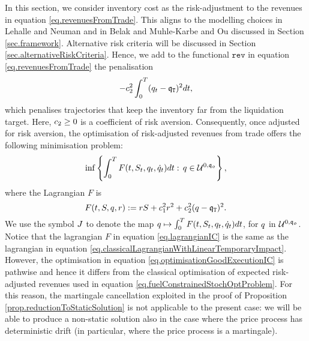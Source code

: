 \documentclass[10pt,a4paper]{article}
\begin{document}
In this section, we consider inventory cost as the risk-adjustment to the revenues in equation \eqref{eq.revenuesFromTrade}. This aligns to the modelling choices in Lehalle and Neuman \cite{LN19inc} and in Belak and Muhle-Karbe and Ou \cite{BMO18opt} discussed in Section \ref{sec.framework}. Alternative risk criteria will be discussed in Section \ref{sec.alternativeRiskCriteria}. Hence, we  add to the functional $\mathtt{rev}$ in equation \eqref{eq.revenuesFromTrade} the penalisation 
\begin{equation}\label{eq.classicalRiskAversion}
-c_{2}^{2} \int_{0}^{T} (q_t- \mathfrak{q}_{\mathtt{T} })^{2} dt,
\end{equation}
which penalises trajectories that keep the inventory far from the liquidation target. Here, $c_{2}\geq 0$ is a coefficient of risk aversion. Consequently, once adjusted for risk aversion, the optimisation of risk-adjusted revenues from trade  offers the following minimisation problem:
\begin{equation}\label{eq.optimisationGoodExecutionIC}
\inf \left\lbrace
\int_{0}^{T} F (t,S_t, q_t,\dot{q}_{t} )dt: \,  q \in \mathcal{U}^{0,\mathfrak{q_0}}
\right\rbrace,
\end{equation}
where the Lagrangian $F$ is 
\begin{equation}\label{eq.lagrangianIC}
F(t,S,q,r):= rS + c_{1}^{2} r^{2} +c_{2}^{2} (q-\mathfrak{q}_{\mathtt{T} })^{2}.
\end{equation}
We use the symbol $J$ to denote the map $q  \mapsto \int_{0}^{T} F (t,S_t, q_t,\dot{q}_{t} )dt$, for $q$ in $\mathcal{U}^{0,\mathfrak{q_0}}$. 
Notice that the lagrangian $F$ in equation \eqref{eq.lagrangianIC} is the same as the lagrangian in equation \eqref{eq.classicalLagrangianWithLinearTemporaryImpact}. However, the optimisation in equation \eqref{eq.optimisationGoodExecutionIC} is pathwise and hence it  differs from the classical optimisation of expected risk-adjusted revenues used in equation \eqref{eq.fuelConstrainedStochOptProblem}. For this reason, the martingale cancellation exploited in the proof of Proposition \ref{prop.reductionToStaticSolution} is not applicable to the  present case: we will be able to produce a non-static solution also in the case where the price process has deterministic drift (in particular, where the price process is a martingale). 
\end{document}
